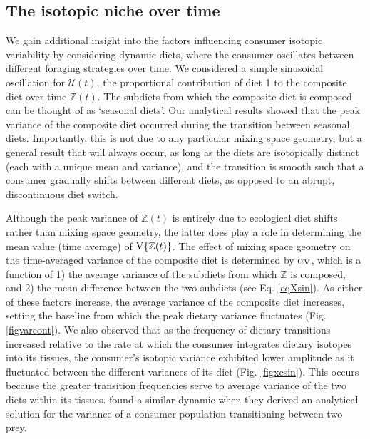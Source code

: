 \documentclass{frontiersSCNS}
\begin{document}
\subsection*{The isotopic niche over time}

We gain additional insight into the factors influencing consumer isotopic variability by considering dynamic diets, where the consumer oscillates between different foraging strategies over time.
We considered a simple sinusoidal oscillation for $\mathcal{U}(t)$, the proportional contribution of diet 1 to the composite diet over time $\mathbb{Z}(t)$.
The subdiets from which the composite diet is composed can be thought of as `seasonal diets'.
Our analytical results showed that the peak variance of the composite diet occurred during the transition between seasonal diets.
Importantly, this is not due to any particular mixing space geometry, but a general result that will always occur, as long as the diets are isotopically distinct (each with a unique mean and variance), and the transition is smooth such that a consumer gradually shifts between different diets, as opposed to an abrupt, discontinuous diet switch.

Although the peak variance of $\mathbb{Z}(t)$ is entirely due to ecological diet shifts rather than mixing space geometry, the latter does play a role in determining the mean value (time average) of ${\rm V}\{\mathbb{Z}(t)\}$.
The effect of mixing space geometry on the time-averaged variance of the composite diet is determined by $\alpha_{\rm V}$, which is a function of
1) the average variance of the subdiets from which $\mathbb{Z}$ is composed, and
2) the mean difference between the two subdiets (see Eq. \ref{eqXsin}).
As either of these factors increase, the average variance of the composite diet increases, setting the baseline from which the peak dietary variance fluctuates (Fig. \ref{figvarcont}).
We also observed that as the frequency of dietary transitions increased relative to the rate at which the consumer integrates dietary isotopes into its tissues, the consumer's isotopic variance exhibited lower amplitude as it fluctuated between the different variances of its diet (Fig. \ref{figxcsin}).
This occurs because the greater transition frequencies serve to average variance of the two diets within its tissues.
\citet{Fink:2012eg} found a similar dynamic when they derived an analytical solution for the variance of a consumer population transitioning between two prey.
\end{document}
